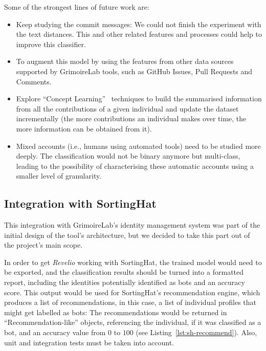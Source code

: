 \documentclass[a4paper, 12pt]{book}
\begin{document}
Some of the strongest lines of future work are:
\begin{itemize}
    \item Keep studying the commit messages: We could not finish the experiment with the text distances. This and other related features and processes could help to improve this classifier.
    \item To augment this model by using the features from other data sources supported by GrimoireLab tools, such as GitHub Issues, Pull Requests and Comments. 
    \item Explore ``Concept Learning''~\cite{machinelearning-artdatascience} techniques to build the summarised information from all the contributions of a given individual and update the dataset incrementally (the more contributions an individual makes over time, the more information can be obtained from it).
    \item Mixed accounts (i.e., humans using automated tools) need to be studied more deeply. The classification would not be binary anymore but multi-class, leading to the possibility of characterising these automatic accounts using a smaller level of granularity. 
\end{itemize}

\subsection{Integration with SortingHat}
\label{ssec:integration-sortinghat}

This integration with GrimoireLab's identity management system was part of the initial design of the tool's architecture, but we decided to take this part out of the project's main scope.

In order to get \emph{Revelio} working with SortingHat, the trained model would need to be exported, and the classification results should be turned into a formatted report, including the identities potentially identified as bots and an accuracy score. This output would be used for SortingHat's recommendation engine, which produces a list of recommendations, in this case, a list of individual profiles that might get labelled as bots: The recommendations would be returned in ``Recommendation-like'' objects, referencing the individual, if it was classified as a bot, and an accuracy value from $0$ to $100$ (see Listing~\ref{lst:sh-recommend}). Also, unit and integration tests must be taken into account.
\end{document}
